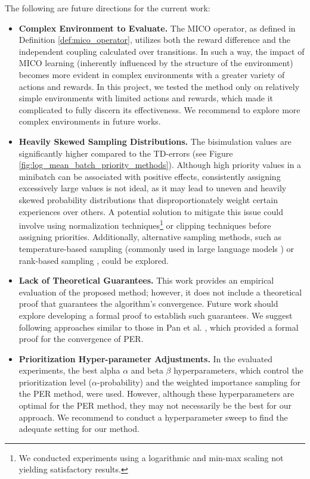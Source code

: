 The following are future directions for the current work:

\begin{itemize}
    \item \textbf{Complex Environment to Evaluate.} The MICO operator, as defined in Definition \ref{def:mico_operator}, utilizes both the reward difference and the independent coupling calculated over transitions. In such a way, the impact of MICO learning (inherently influenced by the structure of the environment) becomes more evident in complex environments with a greater variety of actions and rewards. In this project, we tested the method only on relatively simple environments with limited actions and rewards, which made it complicated to fully discern its effectiveness. We recommend to explore more complex environments in future works.
    \item \textbf{Heavily Skewed Sampling Distributions.} The bisimulation values are significantly higher compared to the TD-errors (see Figure \ref{fig:log_mean_batch_priority_methods}). Although high priority values in a minibatch can be associated with positive effects, consistently assigning excessively large values is not ideal, as it may lead to uneven and heavily skewed probability distributions that disproportionately weight certain experiences over others. A potential solution to mitigate this issue could involve using normalization techniques\footnote{We conducted experiments using a logarithmic and min-max scaling not yielding satisfactory results.} or clipping techniques before assigning priorities. Additionally, alternative sampling methods, such as temperature-based sampling (commonly used in large language models \cite{jm3}) or rank-based sampling \cite{schaul2015prioritized}, could be explored.
    \item \textbf{Lack of Theoretical Guarantees.} This work provides an empirical evaluation of the proposed method; however, it does not include a theoretical proof that guarantees the algorithm's convergence. Future work should explore developing a formal proof to establish such guarantees. We suggest following approaches similar to those in Pan et al. \cite{pan2022understanding}, which provided a formal proof for the convergence of PER.
    \item \textbf{Prioritization Hyper-parameter Adjustments.} In the evaluated experiments, the best alpha $\alpha$ and beta $\beta$ hyperparameters, which control the prioritization level ($\alpha$-probability) and the weighted importance sampling for the PER \cite{schaul2015prioritized} method, were used. However, although these hyperparameters are optimal for the PER method, they may not necessarily be the best for our approach. We recommend to conduct a hyperparameter sweep to find the adequate setting for our method.

\end{itemize}
